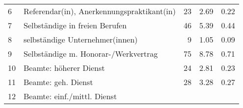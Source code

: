 \begin{longtable}{lXrrr}
     6 &
     \multicolumn{1}{X}{ Referendar(in), Anerkennungspraktikant(in)   } &


       \num{23} &
       \num[round-mode=places,round-precision=2]{2.69} &
         \num[round-mode=places,round-precision=2]{0.22} \\

     7 &
     \multicolumn{1}{X}{ Selbständige in freien Berufen   } &


       \num{46} &
       \num[round-mode=places,round-precision=2]{5.39} &
         \num[round-mode=places,round-precision=2]{0.44} \\

     8 &
     \multicolumn{1}{X}{ selbständige Unternehmer(innen)   } &


       \num{9} &
       \num[round-mode=places,round-precision=2]{1.05} &
         \num[round-mode=places,round-precision=2]{0.09} \\

     9 &
     \multicolumn{1}{X}{ Selbständige m. Honorar-/Werkvertrag   } &


       \num{75} &
       \num[round-mode=places,round-precision=2]{8.78} &
         \num[round-mode=places,round-precision=2]{0.71} \\

     10 &
     \multicolumn{1}{X}{ Beamte: höherer Dienst   } &


       \num{24} &
       \num[round-mode=places,round-precision=2]{2.81} &
         \num[round-mode=places,round-precision=2]{0.23} \\

     11 &
     \multicolumn{1}{X}{ Beamte: geh. Dienst   } &


       \num{28} &
       \num[round-mode=places,round-precision=2]{3.28} &
         \num[round-mode=places,round-precision=2]{0.27} \\

     12 &
     \multicolumn{1}{X}{ Beamte: einf./mittl. Dienst   } &



\end{longtable}
